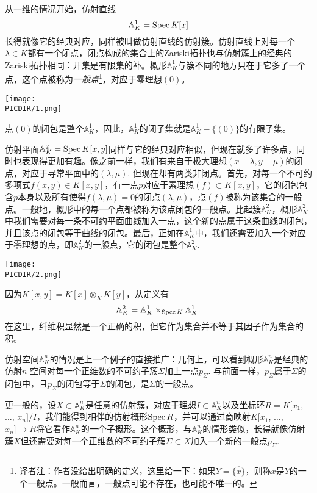 从一维的情况开始，仿射直线
\[
	\mathbb{A}^1_K=\operatorname{Spec} K[x]
\]
长得就像它的经典对应，同样被叫做仿射直线的仿射簇。仿射直线上对每一个$\lambda\in K$都有一个闭点，闭点构成的集合上的Zariski拓扑也与仿射簇上的经典的Zariski拓扑相同：开集是有限集的补。概形$\mathbb{A}^1_K$与簇不同的地方只在于它多了一个点，这个点被称为\textit{一般点}\footnote{译者注：作者没给出明确的定义，这里给一下：如果$Y=\overline{\{x\}}$，则称$x$是$Y$的一个一般点。一般而言，一般点可能不存在，也可能不唯一的。}，对应于零理想$(0)$。
\vspace{-1ex}\begin{center}\texttt{[image: \\PICDIR/1.png]}\end{center}
\vspace{-2ex}点$(0)$的闭包是整个$\mathbb{A}^1_K$，因此，$\mathbb{A}^1_K$的闭子集就是$\mathbb{A}^1_K-\{(0)\}$的有限子集。

仿射平面$\mathbb{A}^2_K=\operatorname{Spec} K[x,y]$同样与它的经典对应相似，但现在就多了许多点，同时也表现得更加有趣。像之前一样，我们有来自于极大理想$(x-\lambda,y-\mu)$的闭点，对应于寻常平面中的$(\lambda,\mu)$. 但现在却有两类非闭点。首先，对每一个不可约多项式$f(x,y)\in K[x,y]$，有一点$p$对应于素理想$(f)\subset K[x,y]$，它的闭包包含$p$本身以及所有使得$f(\lambda,\mu)=0$的闭点$(\lambda,\mu)$，点$(f)$被称为该集合的一般点。一般地，概形中的每一个点都被称为该点闭包的一般点。比起簇$\mathbb{A}^2_K$，概形$\mathbb{A}^2_K$中我们需要对每一条不可约平面曲线加入一点，这个新的点属于这条曲线的闭包，并且该点的闭包等于曲线的闭包。最后，正如在$\mathbb{A}^1_K$中，我们还需要加入一个对应于零理想的点，即$\mathbb{A}^2_K$的一般点，它的闭包是整个$\mathbb{A}^2_K$.

\begin{center}\texttt{[image: \\PICDIR/2.png]}\end{center}

因为$K[x,y]=K[x]\otimes_K K[y]$，从定义有
\[
	\mathbb{A}^2_K=\mathbb{A}^1_K\times_{\operatorname{Spec} K}\mathbb{A}^1_K.
\]
在这里，纤维积显然是一个正确的积，但它作为集合并不等于其因子作为集合的积。

仿射空间$\mathbb{A}^n_K$的情况是上一个例子的直接推广：几何上，可以看到概形$\mathbb{A}^n_K$是经典的仿射$n$-空间对每一个正维数的不可约子簇$\Sigma$加上一点$p_\Sigma$. 与前面一样，$p_\Sigma$属于$\Sigma$的闭包中，且$p_\Sigma$的闭包等于$\Sigma$的闭包，是$\Sigma$的一般点。

更一般的，设$X\subset \mathbb{A}^n_K$是任意的仿射簇，对应于理想$I\subset \mathbb{A}^n_K$以及坐标环$R=K[x_1$, $\dots$, $x_n]/I$，我们能得到相伴的仿射概形$\operatorname{Spec} R$，并可以通过商映射$K[x_1$, $\dots$, $x_n]\to R$将它看作$\mathbb{A}^n_K$的一个子概形。这个概形，与$\mathbb{A}^n_K$的情形类似，长得就像仿射簇$X$但还需要对每一个正维数的不可约子簇$\Sigma\subset X$加入一个新的一般点$p_\Sigma$.

